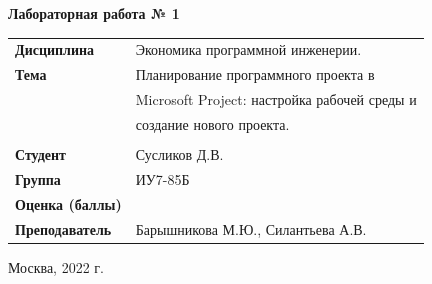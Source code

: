 \documentclass[a4paper,14pt]{extreport} %
\begin{document}
\begin{titlepage}
    \vspace{2cm}

    \begin{center}
        \textbf{Лабораторная работа № 1} \\
        \vspace{0.5cm}
    \end{center}

    \vspace{4cm}

    \begin{flushleft}
        \begin{tabular}{ll}
            \textbf{Дисциплина} & Экономика программной инженерии.  \\
            \textbf{Тема} & Планирование программного проекта в \\ 
            & Microsoft Project: настройка рабочей среды и \\
            & создание нового проекта.  \\
            \\
            \textbf{Студент} & Сусликов Д.В. \\
            \textbf{Группа} & ИУ7-85Б \\
            \textbf{Оценка (баллы)} & \\
            \textbf{Преподаватель} & Барышникова М.Ю., Силантьева А.В.   \\
        \end{tabular}
    \end{flushleft}

    \vspace{4cm}

   \begin{center}
        Москва, 2022 г.
    \end{center}

\end{titlepage}
\end{document}
